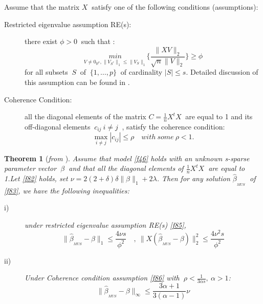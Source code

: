 \documentclass[12pt]{report}
\newtheorem{theoreme}{Theorem}[section] %
\begin{document}
Assume that the matrix $X\ $ satisfy one of the following conditions (assumptions):
\begin{description}
	\item[Restricted eigenvalue assumption RE(s):] there exist $\phi>0\ $ such that :
	\begin{equation}
		\underset{V\neq0_{\mathbb{R}^{p}},\parallel V_{S^{c}}\parallel_{1}\leq\parallel V_{S}\parallel_{1}}{min}\bigg\{\frac{\parallel XV\parallel_{2}}{\sqrt{n}\parallel V \parallel_{2}}\bigg\}\geq\phi
		\label{f85}
	\end{equation}
for all subsets $\ S\ $ of $\ \{1,\dots,p\}\ $ of cardinality $|S|\leq s$. Detailed discussion of this assumption can be found in \cite{nref24}.
\item[Coherence Condition:] all the diagonal elements of the matrix $C=\frac{1}{n}X^{t}X\ $ are equal to 1 and its off-diagonal elements $\ c_{ij}\ i\neq j\  $ , satisfy the coherence condition:
\begin{equation}
	\underset{i\neq j}{\max}|c_{ij}|\leq\rho\quad with\ some \ \rho<1.
	\label{f86}
\end{equation}
\end{description}
\begin{theoreme}[\textit{from \cite{nref23}}]
	Assume that model \eqref{f46} holds with an unknown \textit{s-sparse} parameter vector $\ \beta\ $ and that all the diagonal elements of $\frac{1}{n}X^{t}X\ $ are equal to 1.Let \eqref{f82} holds, set $\nu=2(2+\delta)\delta\parallel\beta\parallel_{1}+2\lambda$. Then for any solution $\hat{\beta}_{_{MUS}}\ $ of \eqref{f83}, we have the following inequalities:
	\begin{description}
		\item[i)] under restricted eigenvalue assumption RE(s) \eqref{f85},
		\begin{equation}
			\parallel\hat{\beta}_{_{MUS}}-\beta \parallel_{1}\leq\frac{4\nu s}{\phi^{2}}\quad ,\ 	\parallel X(\hat{\beta}_{_{MUS}}-\beta )\parallel_{2}^{2}\leq\frac{4\nu^{2} s}{\phi^{2}}
			\label{f87}
			\end{equation}
	\item[ii)] Under Coherence condition assumption \eqref{f86} with $\ \rho<\frac{1}{3\alpha s},\ \alpha>1$:
	\begin{equation}
			\parallel\hat{\beta}_{_{MUS}}-\beta \parallel_{\infty}\leq\frac{3\alpha +1}{3(\alpha-1)}\nu
			\label{f88}
	\end{equation}
		\end{description}
\end{theoreme}
\end{document}

